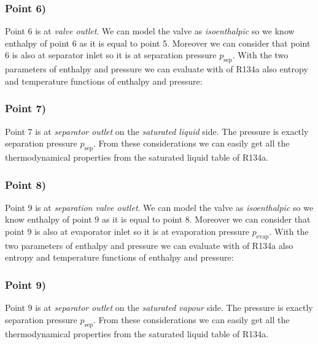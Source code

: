 \documentclass[a4paper,12pt]{article}
\newcommand{\pevap}{p_{\text{evap}}}
\newcommand{\psep}{p_{\text{sep}}}
\begin{document}
\subsubsection*{Point 6)}
Point 6 is at \emph{valve outlet}. We can model the valve as \emph{isoenthalpic} so we know enthalpy of point 6 as it is equal to point 5. Moreover we can consider that point 6 is also at separator inlet so it is at separation pressure $\psep$. With the two parameters of enthalpy and pressure we can evaluate with \md of R134a also entropy and temperature functions of enthalpy and pressure: 
%
%
%
\subsubsection*{Point 7)}
Point 7 is at \emph{separator outlet} on the \emph{saturated liquid} side. The pressure is exactly separation pressure $\psep$. From these considerations we can easily get all the thermodynamical properties from the saturated liquid table of R134a.
%
%
%
\subsubsection*{Point 8)}
Point 9 is at \emph{separation valve outlet}. We can model the valve as \emph{isoenthalpic} so we know enthalpy of point 9 as it is equal to point 8. Moreover we can consider that point 9 is also at evaporator inlet so it is at evaporation pressure $\pevap$. With the two parameters of enthalpy and pressure we can evaluate with \md of R134a also entropy and temperature functions of enthalpy and pressure: 
%
%
%


\subsubsection*{Point 9)}
Point 9 is at \emph{separator outlet} on the \emph{saturated vapour} side. The pressure is exactly separation pressure $\psep$. From these considerations we can easily get all the thermodynamical properties from the saturated liquid table of R134a.
%
%
%
\end{document}
